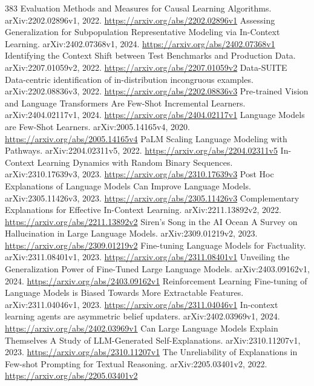 \documentclass[11pt]{article}
\begin{document}
\begin{thebibliography}{383}
 Evaluation Methods and Measures for Causal Learning Algorithms. arXiv:2202.02896v1, 2022. \url{https://arxiv.org/abs/2202.02896v1}
 Assessing Generalization for Subpopulation Representative Modeling via In-Context Learning. arXiv:2402.07368v1, 2024. \url{https://arxiv.org/abs/2402.07368v1}
 Identifying the Context Shift between Test Benchmarks and Production Data. arXiv:2207.01059v2, 2022. \url{https://arxiv.org/abs/2207.01059v2}
 Data-SUITE Data-centric identification of in-distribution incongruous examples. arXiv:2202.08836v3, 2022. \url{https://arxiv.org/abs/2202.08836v3}
 Pre-trained Vision and Language Transformers Are Few-Shot Incremental Learners. arXiv:2404.02117v1, 2024. \url{https://arxiv.org/abs/2404.02117v1}
 Language Models are Few-Shot Learners. arXiv:2005.14165v4, 2020. \url{https://arxiv.org/abs/2005.14165v4}
 PaLM Scaling Language Modeling with Pathways. arXiv:2204.02311v5, 2022. \url{https://arxiv.org/abs/2204.02311v5}
 In-Context Learning Dynamics with Random Binary Sequences. arXiv:2310.17639v3, 2023. \url{https://arxiv.org/abs/2310.17639v3}
 Post Hoc Explanations of Language Models Can Improve Language Models. arXiv:2305.11426v3, 2023. \url{https://arxiv.org/abs/2305.11426v3}
 Complementary Explanations for Effective In-Context Learning. arXiv:2211.13892v2, 2022. \url{https://arxiv.org/abs/2211.13892v2}
 Siren's Song in the AI Ocean A Survey on Hallucination in Large Language Models. arXiv:2309.01219v2, 2023. \url{https://arxiv.org/abs/2309.01219v2}
 Fine-tuning Language Models for Factuality. arXiv:2311.08401v1, 2023. \url{https://arxiv.org/abs/2311.08401v1}
 Unveiling the Generalization Power of Fine-Tuned Large Language Models. arXiv:2403.09162v1, 2024. \url{https://arxiv.org/abs/2403.09162v1}
 Reinforcement Learning Fine-tuning of Language Models is Biased Towards More Extractable Features. arXiv:2311.04046v1, 2023. \url{https://arxiv.org/abs/2311.04046v1}
 In-context learning agents are asymmetric belief updaters. arXiv:2402.03969v1, 2024. \url{https://arxiv.org/abs/2402.03969v1}
 Can Large Language Models Explain Themselves A Study of LLM-Generated Self-Explanations. arXiv:2310.11207v1, 2023. \url{https://arxiv.org/abs/2310.11207v1}
 The Unreliability of Explanations in Few-shot Prompting for Textual Reasoning. arXiv:2205.03401v2, 2022. \url{https://arxiv.org/abs/2205.03401v2}

\end{thebibliography}
\end{document}
